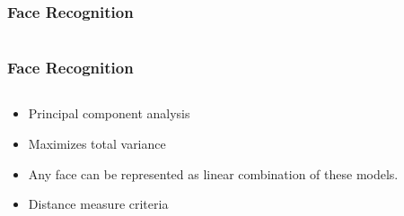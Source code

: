 \documentclass[aspectratio=149]{beamer}
\begin{document}
\begin{frame}
\frametitle{Face Recognition}
\begin{columns}
	\begin{column}{.35\textwidth}
		
	\end{column}
	\begin{column}{.35\textwidth}
		
	\end{column}
	\begin{column}{.35\textwidth}
		
	\end{column}
\end{columns} 
\end{frame}


\begin{frame}
\frametitle{Face Recognition}
\begin{columns}
	\begin{column}{.35\textwidth}
		\begin{itemize}
			\item Principal component analysis
			\item Maximizes total variance
			\item Any face can be represented as linear combination of these models.
			\item Distance measure criteria
		\end{itemize}
	\end{column}
	\begin{column}{.35\textwidth}
		
	\end{column}
	\begin{column}{.35\textwidth}
		
	\end{column}
\end{columns} 

\end{frame}
\end{document}
